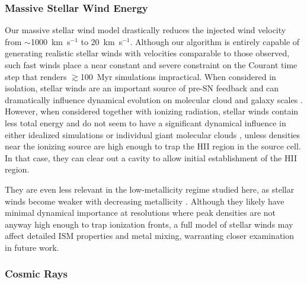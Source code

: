 \subsubsection{Massive Stellar Wind Energy}
\label{ch1:sec:stellar winds discussion}
Our massive stellar wind model drastically reduces the injected wind velocity from $\sim$1000~km~s$^{-1}$ to 20~km~s$^{-1}$. Although our algorithm is entirely capable of generating realistic stellar winds with velocities comparable to those observed, such fast winds place a near constant and severe constraint on the Courant time step that renders $\gtrsim$100~Myr simulations impractical. When considered in isolation, stellar winds are an important source of pre-SN feedback and can dramatically influence dynamical evolution on molecular cloud and galaxy scales \citep{Dale2008,Peters2017,Gatto2017}. However, when considered together with ionizing radiation, stellar winds contain less total energy \citep{Agertz2013} and do not seem to have a significant dynamical influence in either idealized simulations \citep{Geen2015} or  individual giant molecular clouds \citep{Dale2014}, unless densities near the ionizing source are high enough to trap the  HII region in the source cell. In that case, they can clear out a cavity to allow initial establishment of the HII region.

They are even less relevant in the low-metallicity regime studied here, as stellar winds become weaker with decreasing metallicity \citep{Puls2000, Vink2005}. Although they likely have minimal dynamical importance at resolutions where peak densities are not anyway high enough to trap ionization fronts, a full model of stellar winds may affect detailed ISM properties and metal mixing, warranting closer examination in future work.

\subsubsection{Cosmic Rays}
\label{ch1:sec:CRs}

